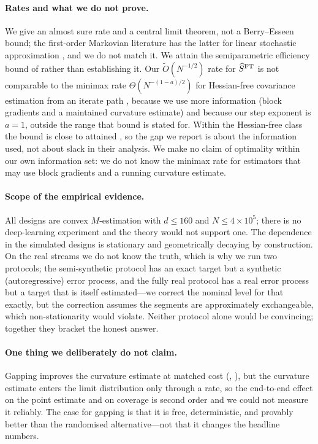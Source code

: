 \paragraph{Rates and what we do not prove.}
We give an almost sure rate and a central limit theorem, not a Berry--Esseen bound; the
first-order Markovian literature has the latter for linear stochastic approximation
\citep{samsonov2025statistical}, and we do not match it. We attain the semiparametric
efficiency bound of \citet{li2023markovian} rather than establishing it. Our
$\widetilde O(N^{-1/2})$ rate for $\widehat{S}^{\mathrm{FT}}$ is not comparable to the minimax rate
$\Theta(N^{-(1-a)/2})$ for Hessian-free covariance estimation from an iterate path
\citep{ni2026online}, because we use more information (block gradients and a maintained
curvature estimate) and because our step exponent is $a=1$, outside the range that bound is
stated for. Within the Hessian-free class the bound is close to attained
\citep{wei2026refining}, so the gap we report is about the information used, not about slack in
their analysis. We make no claim of optimality within our own information set: we do not know
the minimax rate for estimators that may use block gradients and a running curvature estimate.

\paragraph{Scope of the empirical evidence.}
All designs are convex $M$-estimation with $d\le160$ and $N\le4\times10^5$; there is no
deep-learning experiment and the theory would not support one. The dependence in the
simulated designs is stationary and geometrically decaying by construction. On the real
streams we do not know the truth, which is why we run two protocols; the semi-synthetic
protocol has an exact target but a synthetic (autoregressive) error process, and the fully
real protocol has a real error process but a target that is itself estimated---we correct
the nominal level for that exactly, but the correction assumes the segments are
approximately exchangeable, which non-stationarity would violate. Neither protocol alone
would be convincing; together they bracket the honest answer.

\paragraph{One thing we deliberately do not claim.}
Gapping improves the curvature estimate at matched cost (, \RefGapFig{}),
but the curvature estimate enters the limit distribution only through a rate, so the
end-to-end effect on the point estimate and on coverage is second order and we could not
measure it reliably. The case for gapping is that it is free, deterministic, and provably
better than the randomised alternative---not that it changes the headline numbers.
